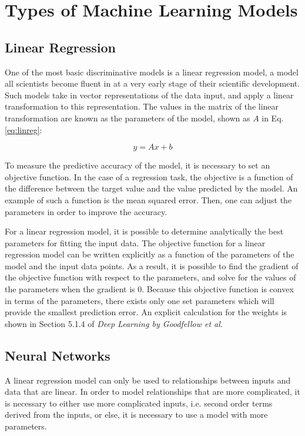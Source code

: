 \section{Types of Machine Learning Models}

\subsection{Linear Regression}

One of the most basic discriminative models is a linear regression model, a model all scientists become fluent in at a very early stage of their scientific development. Such models take in vector representations of the data input, and apply a linear transformation to this representation. The values in the matrix of the linear transformation are known as the parameters of the model, shown as $A$ in Eq. \eqref{eq:linreg}:

\begin{equation}\label{eq:linreg}
  y = Ax + b
\end{equation}

To measure the predictive accuracy of the model, it is necessary to set an objective function. In the case of a regression task, the objective is a function of the difference between the target value and the value predicted by the model. An example of such a function is the mean squared error. Then, one can adjust the parameters in order to improve the accuracy.

For a linear regression model, it is possible to determine analytically the best parameters for fitting the input data. The objective function for a linear regression model can be written explicitly as a function of the parameters of the model and the input data points.
As a result, it is possible to find the gradient of the objective function with respect to the parameters, and solve for the values of the parameters when the gradient is 0. Because this objective function is convex in terms of the parameters, there exists only one set parameters which will provide the smallest prediction error. An explicit calculation for the weights is shown in Section 5.1.4 of \textit{Deep Learning by Goodfellow et al\cite{Goodfellow-et-al-2016}.}

\subsection{Neural Networks}

A linear regression model can only be used to relationships between inputs and data that are linear. In order to model relationships that are more complicated, it is necessary to either use more complicated inputs, i.e. second order terms derived from the inputs, or else, it is necessary to use a model with more parameters.

